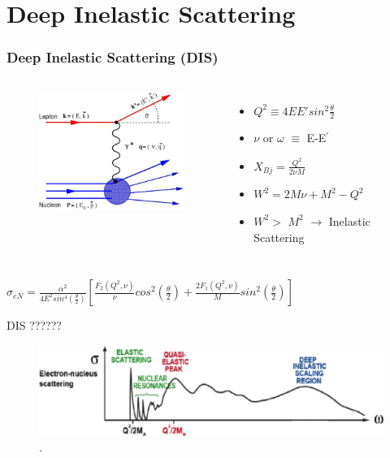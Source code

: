 \documentclass[12pt]{beamer}
\begin{document}
\section[DIS]{Deep Inelastic Scattering}
\begin{frame}
\frametitle{Deep Inelastic Scattering (DIS)}
\vspace*{-20pt}
\begin{columns}[c] %
	\begin{figure}
		\includegraphics[width =5cm]{../images/DIS.pdf}
	\end{figure}
	\begin{itemize}
		\item $ Q^2 \equiv 4EE' sin^2 \frac{\theta}{2} $
		\item $\nu$ or $\omega$ $\equiv$ E-E$^{\prime}$
		\item $X_{Bj}= \frac{Q^2}{2\nu M}$
		\item  $W^2 = 2M\nu + M^2 - Q^2$
		\item $W^2 >$ $M^2$ $\rightarrow$ Inelastic Scattering  
	\end{itemize}
\end{columns}
	\vspace*{10pt}
	\centering
	\Large	$\sigma_{eN} = \frac{\alpha^2}{4E^2sin^4(\frac{\theta}{2})} [\frac{F_2(Q^2,\nu)}{\nu}cos^2\left(\frac{\theta}{2}\right) + \frac{2F_1(Q^2,\nu)}{M}sin^2\left(\frac{\theta}{2}\right)] $	
\end{frame}

\begin{frame}
\begin{block}{DIS ??????}
	\begin{figure}[]
		\centering
		\includegraphics[width=12cm]{../images/Thesis/E_nucleus_spect.pdf}
		\vspace{20pt}
		\caption*{ \cite{spectrum}.}
		
	\end{figure}

\end{block}
\end{frame}
\end{document}
